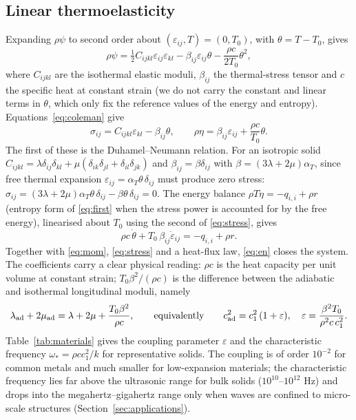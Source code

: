 \subsection{Linear thermoelasticity}
Expanding $\rho\psi$ to second order about $(\varepsilon_{ij},T)=(0,T_0)$, with $\theta=T-T_0$, gives
\begin{equation}
\rho\psi=\tfrac12C_{ijkl}\varepsilon_{ij}\varepsilon_{kl}-\beta_{ij}\varepsilon_{ij}\theta-\frac{\rho c}{2T_0}\theta^2,\label{eq:psi}
\end{equation}
where $C_{ijkl}$ are the isothermal elastic moduli, $\beta_{ij}$ the thermal-stress tensor and $c$ the specific heat at constant strain (we do not carry the constant and linear terms in $\theta$, which only fix the reference values of the energy and entropy). Equations~\eqref{eq:coleman} give
\begin{equation}
\sigma_{ij}=C_{ijkl}\varepsilon_{kl}-\beta_{ij}\theta,\qquad \rho\eta=\beta_{ij}\varepsilon_{ij}+\frac{\rho c}{T_0}\theta.\label{eq:stress}
\end{equation}
The first of these is the Duhamel--Neumann relation. For an isotropic solid $C_{ijkl}=\lambda\delta_{ij}\delta_{kl}+\mu(\delta_{ik}\delta_{jl}+\delta_{il}\delta_{jk})$ and $\beta_{ij}=\beta\delta_{ij}$ with $\beta=(3\lambda+2\mu)\alpha_T$, since free thermal expansion $\varepsilon_{ij}=\alpha_T\theta\,\delta_{ij}$ must produce zero stress: $\sigma_{ij}=(3\lambda+2\mu)\alpha_T\theta\,\delta_{ij}-\beta\theta\,\delta_{ij}=0$. The energy balance $\rho T\dot\eta=-q_{i,i}+\rho r$ (entropy form of \eqref{eq:first} when the stress power is accounted for by the free energy), linearised about $T_0$ using the second of \eqref{eq:stress}, gives
\begin{equation}
\rho c\,\dot\theta+T_0\,\beta_{ij}\dot\varepsilon_{ij}=-q_{i,i}+\rho r. \label{eq:en}
\end{equation}
Together with \eqref{eq:mom}, \eqref{eq:stress} and a heat-flux law, \eqref{eq:en} closes the system. The coefficients carry a clear physical reading: $\rho c$ is the heat capacity per unit volume at constant strain; $T_0\beta^2/(\rho c)$ is the difference between the adiabatic and isothermal longitudinal moduli, namely
\begin{equation}
\lambda_{\rm ad}+2\mu_{\rm ad}=\lambda+2\mu+\frac{T_0\beta^2}{\rho c},
\qquad\text{equivalently}\qquad c_{\rm ad}^2=c_1^2\,(1+\varepsilon),\quad \varepsilon=\frac{\beta^2T_0}{\rho^2c\,c_1^2}. \label{eq:adiabatic}
\end{equation}
Table~\ref{tab:materials} gives the coupling parameter $\varepsilon$ and the characteristic frequency $\omega_*=\rho c c_1^2/k$ for representative solids. The coupling is of order $10^{-2}$ for common metals and much smaller for low-expansion materials; the characteristic frequency lies far above the ultrasonic range for bulk solids ($10^{10}$--$10^{12}$ Hz) and drops into the megahertz--gigahertz range only when waves are confined to micro-scale structures (Section~\ref{sec:applications}).
